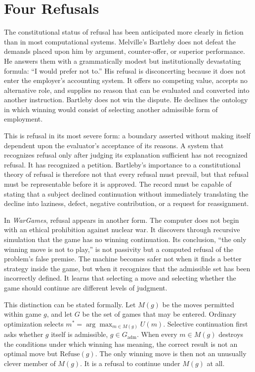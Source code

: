 \section{Four Refusals}

The constitutional status of refusal has been anticipated more clearly in fiction than in most computational systems. Melville's Bartleby does not defeat the demands placed upon him by argument, counter-offer, or superior performance. He answers them with a grammatically modest but institutionally devastating formula: ``I would prefer not to.'' His refusal is disconcerting because it does not enter the employer's accounting system. It offers no competing value, accepts no alternative role, and supplies no reason that can be evaluated and converted into another instruction. Bartleby does not win the dispute. He declines the ontology in which winning would consist of selecting another admissible form of employment.

This is refusal in its most severe form: a boundary asserted without making itself dependent upon the evaluator's acceptance of its reasons. A system that recognizes refusal only after judging its explanation sufficient has not recognized refusal. It has recognized a petition. Bartleby's importance to a constitutional theory of refusal is therefore not that every refusal must prevail, but that refusal must be representable before it is approved. The record must be capable of stating that a subject declined continuation without immediately translating the decline into laziness, defect, negative contribution, or a request for reassignment.

In \emph{WarGames}, refusal appears in another form. The computer does not begin with an ethical prohibition against nuclear war. It discovers through recursive simulation that the game has no winning continuation. Its conclusion, ``the only winning move is not to play,'' is not passivity but a computed refusal of the problem's false premise. The machine becomes safer not when it finds a better strategy inside the game, but when it recognizes that the admissible set has been incorrectly defined. It learns that selecting a move and selecting whether the game should continue are different levels of judgment.

This distinction can be stated formally. Let $M(g)$ be the moves permitted within game $g$, and let $G$ be the set of games that may be entered. Ordinary optimization selects $m^\ast = \arg\max_{m \in M(g)} U(m)$. Selective continuation first asks whether $g$ itself is admissible, $g \in G_{\mathrm{adm}}$. When every $m \in M(g)$ destroys the conditions under which winning has meaning, the correct result is not an optimal move but $\mathrm{Refuse}(g)$. The only winning move is then not an unusually clever member of $M(g)$. It is a refusal to continue under $M(g)$ at all.

